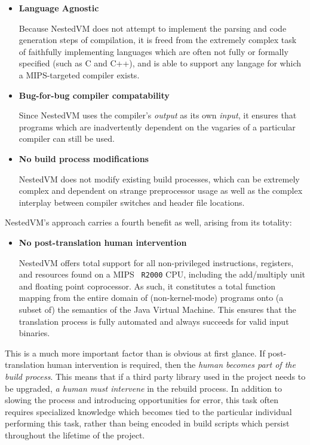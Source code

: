 \documentclass{acmconf}
\begin{document}
\begin{itemize}
\item {\bf Language Agnostic}

      Because NestedVM does not attempt to implement the parsing and
      code generation steps of compilation, it is freed from the
      extremely complex task of faithfully implementing languages
      which are often not fully or formally specified (such as C and
      C++), and is able to support any langage for which a
      MIPS-targeted compiler exists.

\item {\bf Bug-for-bug compiler compatability}

      Since NestedVM uses the compiler's {\it output} as its own {\it
      input}, it ensures that programs which are inadvertently
      dependent on the vagaries of a particular compiler can still be
      used.

\item {\bf No build process modifications}

      NestedVM does not modify existing build processes, which can be
      extremely complex and dependent on strange preprocessor usage as
      well as the complex interplay between compiler switches and
      header file locations.

\end{itemize}

NestedVM's approach carries a fourth benefit as well, arising from its
totality:

\begin{itemize}
\item {\bf No post-translation human intervention}

      NestedVM offers total support for all non-privileged
      instructions, registers, and resources found on a MIPS {\tt
      R2000} CPU, including the add/multiply unit and floating point
      coprocessor.  As such, it constitutes a total function mapping
      from the entire domain of (non-kernel-mode) programs onto (a
      subset of) the semantics of the Java Virtual Machine.  This
      ensures that the translation process is fully automated and
      always succeeds for valid input binaries.
\end{itemize}

This is a much more important factor than is obvious at first glance.
If post-translation human intervention is required, then the {\it
human becomes part of the build process}.  This means that if a third
party library used in the project needs to be upgraded, {\it a human
must intervene} in the rebuild process.  In addition to slowing the
process and introducing opportunities for error, this task often
requires specialized knowledge which becomes tied to the particular
individual performing this task, rather than being encoded in build
scripts which persist throughout the lifetime of the project.
\end{document}
